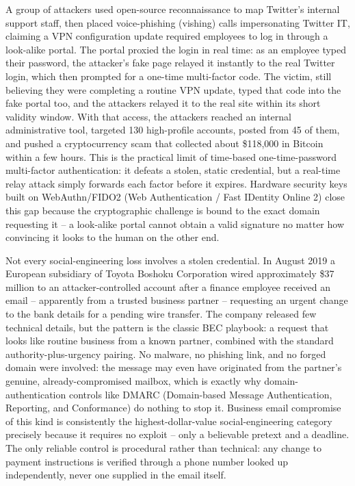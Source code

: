 \begin{example}
A group of attackers used open-source reconnaissance to map Twitter's internal support staff, then
placed voice-phishing (vishing) calls impersonating Twitter IT, claiming a VPN configuration update
required employees to log in through a look-alike portal. The portal proxied the login in real
time: as an employee typed their password, the attacker's fake page relayed it instantly to the
real Twitter login, which then prompted for a one-time multi-factor code. The victim, still
believing they were completing a routine VPN update, typed that code into the fake portal too, and
the attackers relayed it to the real site within its short validity window. With that access, the
attackers reached an internal administrative tool, targeted 130 high-profile accounts, posted from
45 of them, and pushed a cryptocurrency scam that collected about \$118{,}000 in Bitcoin within a
few hours. This is the
practical limit of time-based one-time-password multi-factor authentication: it defeats a stolen,
static credential, but a real-time relay attack simply forwards each factor before it expires.
Hardware security keys built on WebAuthn/FIDO2 (Web Authentication / Fast IDentity Online 2) close
this gap because the cryptographic challenge is bound to the exact domain requesting it -- a
look-alike portal cannot obtain a valid signature no matter how convincing it looks to the human on
the other end.
\end{example}

\begin{example}
Not every social-engineering loss involves a stolen credential. In August 2019 a European
subsidiary of Toyota Boshoku Corporation wired approximately \$37 million to an attacker-controlled
account after a finance employee received an email -- apparently from a trusted business partner --
requesting an urgent change to the bank details for a pending wire transfer. The company released few
technical details, but the pattern is the classic BEC playbook: a request that looks like routine
business from a known partner, combined with the standard authority-plus-urgency pairing. No malware, no phishing link, and no forged domain were involved: the message may even
have originated from the partner's genuine, already-compromised mailbox, which is exactly why
domain-authentication controls like DMARC (Domain-based Message Authentication, Reporting, and
Conformance) do nothing to stop it. Business email compromise of this kind is consistently the
highest-dollar-value social-engineering category precisely because it requires no exploit -- only a
believable pretext and a deadline. The only reliable control is procedural rather than technical:
any change to payment instructions is verified through a phone number looked up independently,
never one supplied in the email itself.
\end{example}

